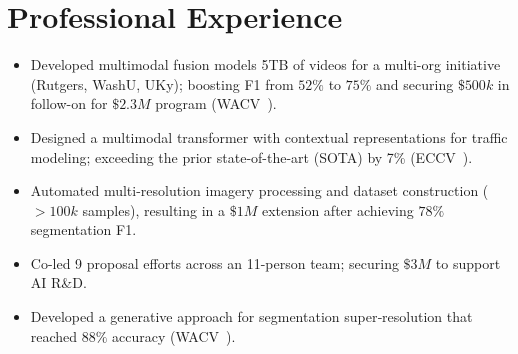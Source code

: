 \documentclass[11pt,a4paper,sans]{moderncv} %
\begin{document}
\makecvtitle %
\vspace*{-1.5cm}



\section{Professional Experience}
{
\begin{itemize}
	\item Developed multimodal fusion models 5TB of videos for a multi-org initiative (Rutgers, WashU, UKy); boosting F1 from $52\%$ to $75\%$ and securing $\$500k$ in follow-on for $\$2.3M$ program (WACV~\cite{greenwell2024watch}).
	\item Designed a multimodal transformer with contextual representations for traffic modeling; exceeding the prior state-of-the-art (SOTA) by 7\% (ECCV~\cite{ProbTraffic}).
	\item Automated multi-resolution imagery processing and dataset construction ($>100k$ samples), resulting in a $\$1M$ extension after achieving $78\%$ segmentation F1.
	\item Co-led 9 proposal efforts across an 11-person team; securing $\$3M$ to support AI R\&D.
	\item Developed a generative approach for segmentation super‑resolution that reached $88\%$ accuracy (WACV~\cite{Low2High}).
\end{itemize}
}

\end{document}
